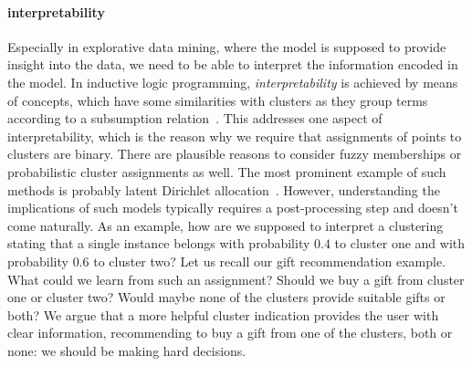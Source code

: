 \paragraph{interpretability} 
Especially in explorative data mining, where the model is supposed to provide insight into the data, we need to be able to interpret the information encoded in the model. In inductive logic programming, \emph{interpretability} is achieved by means of concepts, which have some similarities with clusters as they group terms according to a subsumption relation~\citep{kietz1994polynomial}. This addresses one aspect of interpretability, which is the reason why we require that assignments of points to clusters are binary. There are plausible reasons to consider fuzzy memberships or probabilistic cluster assignments as well. The most prominent example of such methods is probably latent Dirichlet allocation~\citep{blei2003latent}. However, understanding the implications of such models typically requires a post-processing step and doesn't come naturally. As an example, how are we supposed to interpret a clustering stating that a single instance belongs with probability $0.4$ to cluster one and with probability $0.6$ to cluster two? Let us recall our gift recommendation example. What could we learn from such an assignment? Should we buy a gift from cluster one or cluster two? Would maybe none of the clusters provide suitable gifts or both? We argue that a more helpful cluster indication provides the user with clear information, recommending to buy a gift from one of the clusters, both or none: we should be making hard decisions.
